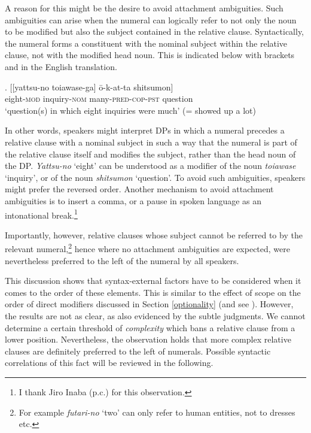 A reason for this might be the desire to avoid attachment ambiguities. Such ambiguities can arise when the numeral can logically refer to not only the noun to be modified but also the subject contained in the relative clause. Syntactically, the numeral forms a constituent with the nominal subject within the relative clause, not with the modified head noun. This is indicated below with brackets and in the English translation. 

\exg. [[yattsu-no toiawase-ga] ō-k-at-ta shitsumon]\\
eight-\textsc{mod} inquiry-\textsc{nom} many-\textsc{pred-cop-pst} question\\
`question(s) in which eight inquiries were much’ (= showed up a lot)

\largerpage
In other words, speakers might interpret DPs in which a numeral precedes a relative clause with a nominal subject in such a way that the numeral is part of the relative clause itself and modifies the subject, rather than the head noun of the DP. \textit{Yattsu-no} `eight’ can be understood as a modifier of the noun \textit{toiawase} `inquiry’, or of the noun \textit{shitsumon} `question’. To avoid such ambiguities, speakers might prefer the reversed order. Another mechanism to avoid attachment ambiguities is to insert a comma, or a pause in spoken language as an intonational break.\footnote{I thank Jiro Inaba (p.c.) for this observation.}

Importantly, however, relative clauses whose subject cannot be referred to by the relevant numeral,\footnote{For example \textit{futari-no} `two’ can only refer to human entities, not to dresses etc.} hence where no attachment ambiguities are expected, were nevertheless preferred to the left of the numeral by all speakers.

This discussion shows that syntax-external factors have to be considered when it comes to the order of these elements. This is similar to the effect of scope on the order of direct modifiers discussed in Section \ref{optionality} (and see \citealt{ramchand:2014:deriving}). However, the results are not as clear, as also evidenced by the subtle judgments. We cannot determine a certain threshold of \textit{complexity} which bans a relative clause from a lower position. Nevertheless, the observation holds that more complex relative clauses are definitely preferred to the left of numerals. Possible syntactic correlations of this fact will be reviewed in the following.

